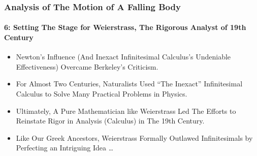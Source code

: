 \begin{frame}
\frametitle{Analysis of The Motion of \alert{A Falling Body}}
\framesubtitle{6: Setting The Stage for Weierstrass, The Rigorous Analyst of 19th Century}
\label{slide:analysis-of-falling-body-6}
\begin{itemize}
\pause
\item Newton's Influence (And Inexact Infinitesimal Calculus's Undeniable Effectiveness) Overcame Berkeley's Criticism.
\pause
\item For Almost Two Centuries, Naturalists Used \alert{``The Inexact'' Infinitesimal Calculus} to Solve Many Practical Problems in Physics.
\pause
\item Ultimately, A Pure Mathematician like Weierstrass Led The Efforts to \alert{Reinstate Rigor in Analysis (Calculus)} in The 19th Century.
\pause
\item Like Our Greek Ancestors, Weierstrass Formally Outlawed Infinitesimals by Perfecting an Intriguing Idea \dots
\end{itemize}
\end{frame}
